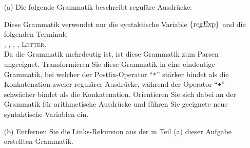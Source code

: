 \exercise
\begin{enumerate}
\item[(a)] Die folgende Grammatik beschreibt regul\"are Ausdr\"ucke:
      \begin{center}    
      \end{center}
      Diese Grammatik verwendet nur die  syntaktische Variable $\{ \textsl{regExp} \}$ und die folgenden 
      Terminale
      \\[0.2cm]
      \hspace*{1.3cm}
      \squoted{+}, \squoted{*}, \squoted{(}, \squoted{)}, \textsc{Letter}.
      \\[0.2cm]
      Da die Grammatik mehrdeutig ist, ist diese Grammatik zum Parsen ungeeignet.
      Transformieren Sie diese Grammatik in eine eindeutige Grammatik, bei welcher der
      Postfix-Operator ``\texttt{*}'' st\"arker bindet als die Konkatenation zweier regul\"arer
      Ausdr\"ucke, w\"ahrend der Operator ``\texttt{+}'' schw\"acher bindet als die Konkatenation. 
      Orientieren Sie sich dabei an der Grammatik f\"ur arithmetische Ausdr\"ucke und f\"uhren
      Sie geeignete neue syntaktische Variablen ein.
\item[(b)] Entfernen Sie die Links-Rekursion aus der in Teil (a) dieser Aufgabe erstellten
      Grammatik. \eox
\end{enumerate}

